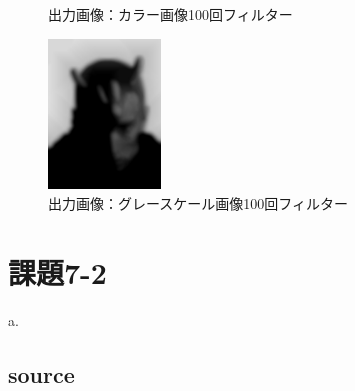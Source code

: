 \documentclass[10pt,a4paper]{jsarticle}
\begin{document}
\begin{figure}[htbp]
\begin{minipage}{0.25\hsize}
    \caption{出力画像：カラー画像100回フィルター}
    \label{fig:sutehage}
  \end{minipage}
  \begin{minipage}{0.25\hsize}
    \begin{center}
      \includegraphics[width=30mm]{FilteredImageGray100.jpg}
    \end{center}
    \caption{出力画像：グレースケール画像100回フィルター}
    \label{fig:sutehage}
  \end{minipage}
\end{figure}

\newpage
\newpage
\section{課題7-2}
\noindent a.
\subsection{source}





\end{document}
